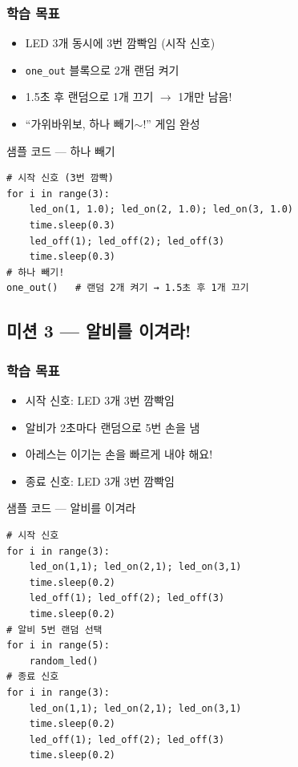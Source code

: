 \subsubsection*{학습 목표}
\begin{itemize}[leftmargin=1.4em]
  \item LED 3개 동시에 3번 깜빡임 (시작 신호)
  \item \texttt{one\_out} 블록으로 2개 랜덤 켜기
  \item 1.5초 후 랜덤으로 1개 끄기 $\rightarrow$ 1개만 남음!
  \item ``가위바위보, 하나 빼기$\sim$!'' 게임 완성
\end{itemize}

\begin{labbox}{샘플 코드 --- 하나 빼기}
\begin{verbatim}
# 시작 신호 (3번 깜빡)
for i in range(3):
    led_on(1, 1.0); led_on(2, 1.0); led_on(3, 1.0)
    time.sleep(0.3)
    led_off(1); led_off(2); led_off(3)
    time.sleep(0.3)
# 하나 빼기!
one_out()   # 랜덤 2개 켜기 → 1.5초 후 1개 끄기
\end{verbatim}
\end{labbox}

\subsection{미션 3 --- 알비를 이겨라!}
\label{subsec:ch06-m3}

\begin{storybox}
\end{storybox}

\subsubsection*{학습 목표}
\begin{itemize}[leftmargin=1.4em]
  \item 시작 신호: LED 3개 3번 깜빡임
  \item 알비가 2초마다 랜덤으로 5번 손을 냄
  \item 아레스는 이기는 손을 빠르게 내야 해요!
  \item 종료 신호: LED 3개 3번 깜빡임
\end{itemize}

\begin{labbox}{샘플 코드 --- 알비를 이겨라}
\begin{verbatim}
# 시작 신호
for i in range(3):
    led_on(1,1); led_on(2,1); led_on(3,1)
    time.sleep(0.2)
    led_off(1); led_off(2); led_off(3)
    time.sleep(0.2)
# 알비 5번 랜덤 선택
for i in range(5):
    random_led()
# 종료 신호
for i in range(3):
    led_on(1,1); led_on(2,1); led_on(3,1)
    time.sleep(0.2)
    led_off(1); led_off(2); led_off(3)
    time.sleep(0.2)
\end{verbatim}
\end{labbox}

